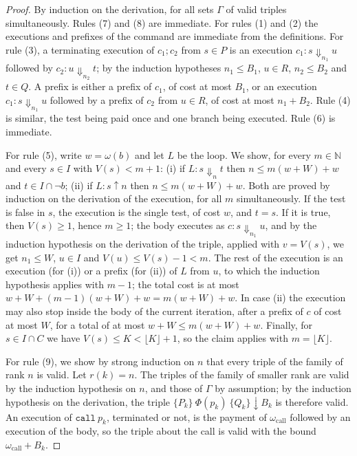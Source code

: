 \documentclass[oneside,english]{amsart}
\numberwithin{equation}{section}
\numberwithin{figure}{section}
\theoremstyle{plain}
\theoremstyle{definition}
\theoremstyle{plain}
\theoremstyle{remark}
\theoremstyle{plain}
\theoremstyle{definition}
\theoremstyle{plain}
\theoremstyle{remark}
\begin{document}
\begin{proof}
By induction on the derivation, for all sets $\Gamma$ of valid triples simultaneously. Rules (7) and (8) are immediate. For rules (1) and (2) the executions and prefixes of the command are immediate from the definitions. For rule (3), a terminating execution of $c_1 ; c_2$ from $s \in P$ is an execution $c_1 : s \Downarrow_{n_1} u$ followed by $c_2 : u \Downarrow_{n_2} t$; by the induction hypotheses $n_1 \le B_1$, $u \in R$, $n_2 \le B_2$ and $t \in Q$. A prefix is either a prefix of $c_1$, of cost at most $B_1$, or an execution $c_1 : s \Downarrow_{n_1} u$ followed by a prefix of $c_2$ from $u \in R$, of cost at most $n_1 + B_2$. Rule (4) is similar, the test being paid once and one branch being executed. Rule (6) is immediate.

For rule (5), write $w = \omega(b)$ and let $L$ be the loop. We show, for every $m \in \mathbb{N}$ and every $s \in I$ with $V(s) < m + 1$: (i) if $L : s \Downarrow_n t$ then $n \le m (w + W) + w$ and $t \in I \cap \neg b$; (ii) if $L : s \uparrow n$ then $n \le m (w + W) + w$. Both are proved by induction on the derivation of the execution, for all $m$ simultaneously. If the test is false in $s$, the execution is the single test, of cost $w$, and $t = s$. If it is true, then $V(s) \ge 1$, hence $m \ge 1$; the body executes as $c : s \Downarrow_{n_1} u$, and by the induction hypothesis on the derivation of the triple, applied with $v = V(s)$, we get $n_1 \le W$, $u \in I$ and $V(u) \le V(s) - 1 < m$. The rest of the execution is an execution (for (i)) or a prefix (for (ii)) of $L$ from $u$, to which the induction hypothesis applies with $m - 1$; the total cost is at most $w + W + (m - 1)(w + W) + w = m (w + W) + w$. In case (ii) the execution may also stop inside the body of the current iteration, after a prefix of $c$ of cost at most $W$, for a total of at most $w + W \le m (w + W) + w$. Finally, for $s \in I \cap C$ we have $V(s) \le K < \lfloor K \rfloor + 1$, so the claim applies with $m = \lfloor K \rfloor$.

For rule (9), we show by strong induction on $n$ that every triple of the family of rank $n$ is valid. Let $r(k) = n$. The triples of the family of smaller rank are valid by the induction hypothesis on $n$, and those of $\Gamma$ by assumption; by the induction hypothesis on the derivation, the triple $\{P_k\}\ \Phi(p_k)\ \{Q_k\}\!\downarrow\! B_k$ is therefore valid. An execution of $\mathtt{call}\ p_k$, terminated or not, is the payment of $\omega_{\mathrm{call}}$ followed by an execution of the body, so the triple about the call is valid with the bound $\omega_{\mathrm{call}} + B_k$.
\end{proof}
\end{document}
